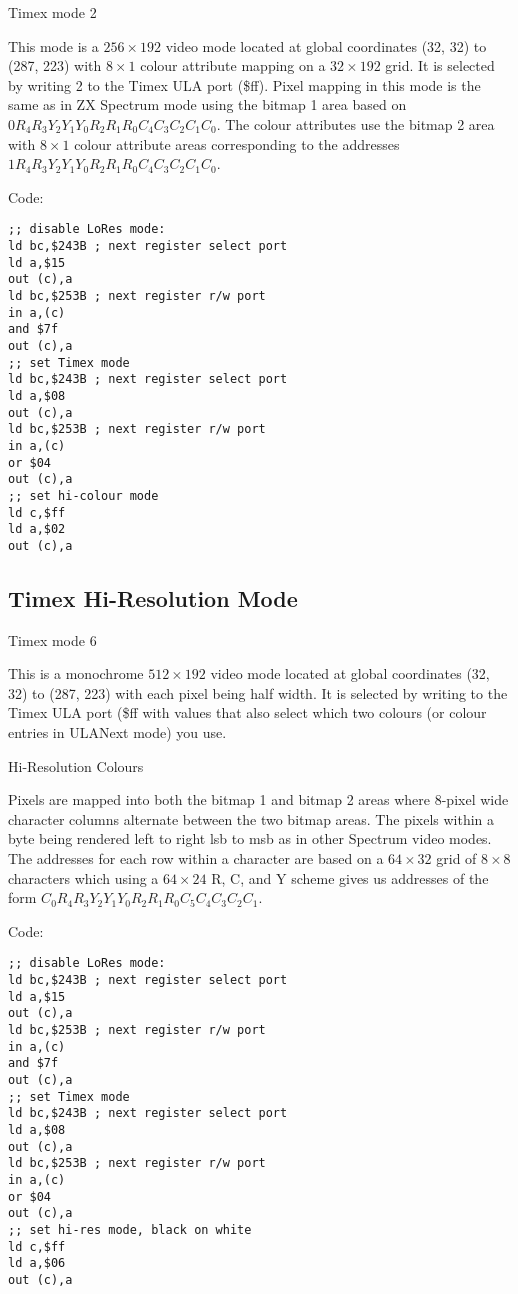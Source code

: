 Timex mode 2

This mode is a $256\times192$ video mode located at global coordinates
(32, 32) to (287, 223) with $8\times1$ colour attribute mapping on a
$32\times192$ grid. It is selected by writing 2 to the Timex ULA port
(\$ff).  Pixel mapping in this mode is the same as in ZX Spectrum mode
using the bitmap 1 area based on
$0R_4R_3Y_2Y_1Y_0R_2R_1R_0C_4C_3C_2C_1C_0$.  The colour attributes use
the bitmap 2 area with $8\times1$ colour attribute areas corresponding
to the addresses $1R_4R_3Y_2Y_1Y_0R_2R_1R_0C_4C_3C_2C_1C_0$.

Code:
\begin{verbatim}
;; disable LoRes mode:
ld bc,$243B ; next register select port
ld a,$15
out (c),a
ld bc,$253B ; next register r/w port
in a,(c)
and $7f
out (c),a
;; set Timex mode
ld bc,$243B ; next register select port
ld a,$08
out (c),a
ld bc,$253B ; next register r/w port
in a,(c)
or $04
out (c),a
;; set hi-colour mode
ld c,$ff
ld a,$02
out (c),a
\end{verbatim}

\subsection{Timex Hi-Resolution Mode}

Timex mode 6

This is a monochrome $512\times192$ video mode located at global
coordinates (32, 32) to (287, 223) with each pixel being half
width. It is selected by writing to the Timex ULA port (\$ff with
values that also select which two colours (or colour entries in
ULANext mode) you use.

\begin{table}[h]\centering
  \caption{Hi-Resolution Colours}
\end{table}
  
Pixels are mapped into both the bitmap 1 and bitmap 2 areas where
8-pixel wide character columns alternate between the two bitmap areas.
The pixels within a byte being rendered left to right lsb to msb as in
other Spectrum video modes.  The addresses for each row within a
character are based on a $64\times32$ grid of $8\times8$ characters
which using a $64\times24$ R, C, and Y scheme gives us addresses of
the form $C_0R_4R_3Y_2Y_1Y_0R_2R_1R_0C_5C_4C_3C_2C_1$.

Code:
\begin{verbatim}
;; disable LoRes mode:
ld bc,$243B ; next register select port
ld a,$15
out (c),a
ld bc,$253B ; next register r/w port
in a,(c)
and $7f
out (c),a
;; set Timex mode
ld bc,$243B ; next register select port
ld a,$08
out (c),a
ld bc,$253B ; next register r/w port
in a,(c)
or $04
out (c),a
;; set hi-res mode, black on white
ld c,$ff
ld a,$06
out (c),a
\end{verbatim}

